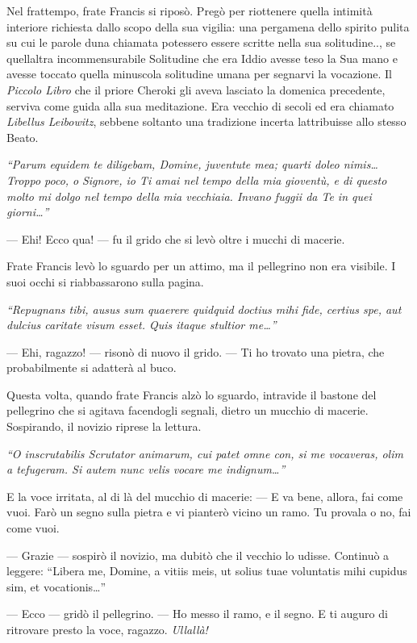 Nel frattempo, frate Francis si riposò. Pregò per riottenere quella
intimità interiore richiesta dallo scopo della sua vigilia: una
pergamena dello spirito pulita su cui le parole d\textquotesingle una
chiamata potessero essere scritte nella sua solitudine.., se
quell\textquotesingle altra incommensurabile Solitudine che era Iddio
avesse teso la Sua mano e avesse toccato quella minuscola solitudine
umana per segnarvi la vocazione. Il \emph{Piccolo Libro} che il priore
Cheroki gli aveva lasciato la domenica precedente, serviva come guida
alla sua meditazione. Era vecchio di secoli ed era chiamato
\emph{Libellus Leibowitz}, sebbene soltanto una tradizione incerta
l\textquotesingle attribuisse allo stesso Beato.

\emph{``Parum equidem te diligebam, Domine, juventute mea; quarti doleo
	nimis\ldots{} Troppo poco, o} \emph{Signore, io Ti amai nel tempo della
	mia gioventù, e di questo molto mi dolgo nel tempo della mia vecchiaia.
	Invano fuggii da Te in quei giorni\ldots''}

--- Ehi! Ecco qua! --- fu il grido che si levò oltre i mucchi di
macerie.

Frate Francis levò lo sguardo per un attimo, ma il pellegrino non era
visibile. I suoi occhi si riabbassarono sulla pagina.

\emph{``Repugnans tibi, ausus sum quaerere quidquid doctius mihi fide,
	certius spe, aut dulcius caritate visum esset. Quis itaque stultior
	me\ldots''}

--- Ehi, ragazzo! --- risonò di nuovo il grido. --- Ti ho trovato una
pietra, che probabilmente si adatterà al buco.

Questa volta, quando frate Francis alzò lo sguardo, intravide il bastone
del pellegrino che si agitava facendogli segnali, dietro un mucchio di
macerie. Sospirando, il novizio riprese la lettura.

\emph{``O inscrutabilis Scrutator animarum, cui patet omne con, si me
	vocaveras, olim a tefugeram. Si autem nunc velis vocare me
	indignum\ldots''}

E la voce irritata, al di là del mucchio di macerie: --- E va bene,
allora, fai come vuoi. Farò un segno sulla pietra e vi pianterò vicino
un ramo. Tu provala o no, fai come vuoi.

--- Grazie --- sospirò il novizio, ma dubitò che il vecchio lo udisse.
Continuò a leggere: ``Libera me, Domine, a vitiis meis, ut solius tuae
voluntatis mihi cupidus sim, et vocationis\ldots''

--- Ecco --- gridò il pellegrino. --- Ho messo il ramo, e il segno. E ti
auguro di ritrovare presto la voce, ragazzo. \emph{Ullallà!}

